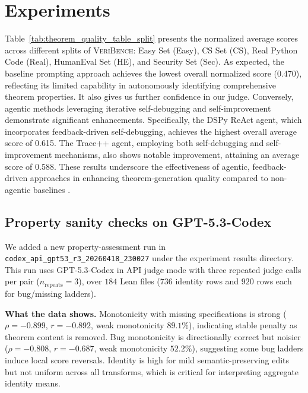 \documentclass{article}
\begin{document}
\section{Experiments}
Table~\ref{tab:theorem_quality_table_split} presents the normalized average scores across different splits of \textsc{VeriBench}: Easy Set (Easy), CS Set (CS), Real Python Code (Real), HumanEval Set (HE), and Security Set (Sec).
As expected, the baseline prompting approach achieves the lowest overall normalized score (0.470), reflecting its limited capability in autonomously identifying comprehensive theorem properties.
It also gives us further confidence in our judge.
Conversely, agentic methods leveraging iterative self-debugging and self-improvement demonstrate significant enhancements.
Specifically, the DSPy ReAct agent, which incorporates feedback-driven self-debugging, achieves the highest overall average score of 0.615.
The Trace++ agent, employing both self-debugging and self-improvement mechanisms, also shows notable improvement, attaining an average score of 0.588.
These results underscore the effectiveness of agentic, feedback-driven approaches in enhancing theorem-generation quality compared to non-agentic baselines \citep{khattab2024dspy,cheng2024trace,chen2021evaluating}.

\subsection{Property sanity checks on GPT-5.3-Codex}
We added a new property-assessment run in
\texttt{codex\_api\_gpt53\_r3\_20260418\_230027} under the experiment results directory.
This run uses GPT-5.3-Codex in API judge mode with three repeated judge calls per pair (\(n_\text{repeats}=3\)), over \(184\) Lean files (\(736\) identity rows and \(920\) rows each for bug/missing ladders).

\textbf{What the data shows.}
Monotonicity with missing specifications is strong (\(\rho=-0.899\), \(r=-0.892\), weak monotonicity \(89.1\%\)), indicating stable penalty as theorem content is removed.
Bug monotonicity is directionally correct but noisier (\(\rho=-0.808\), \(r=-0.687\), weak monotonicity \(52.2\%\)), suggesting some bug ladders induce local score reversals.
Identity is high for mild semantic-preserving edits but not uniform across all transforms, which is critical for interpreting aggregate identity means.
\end{document}
